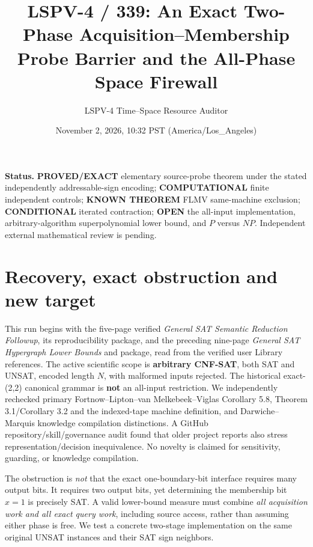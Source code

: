 \documentclass[11pt]{article}
\title{LSPV-4 / 339: An Exact Two-Phase Acquisition--Membership Probe Barrier and the All-Phase Space Firewall}
\author{LSPV-4 Time--Space Resource Auditor}
\date{November 2, 2026, 10:32 PST (America/Los\_Angeles)}
\begin{document}
\maketitle
\noindent\textbf{Status.} \textbf{PROVED/EXACT} elementary source-probe theorem under the stated independently addressable-sign encoding; \textbf{COMPUTATIONAL} finite independent controls; \textbf{KNOWN THEOREM} FLMV same-machine exclusion; \textbf{CONDITIONAL} iterated contraction; \textbf{OPEN} the all-input implementation, arbitrary-algorithm superpolynomial lower bound, and $P$ versus $NP$. Independent external mathematical review is pending.

\section{Recovery, exact obstruction and new target}
This run begins with the five-page verified \emph{General SAT Semantic Reduction Followup}, its reproducibility package, and the preceding nine-page \emph{General SAT Hypergraph Lower Bounds} and package, read from the verified user Library references. The active scientific scope is \textbf{arbitrary CNF-SAT}, both SAT and UNSAT, encoded length $N$, with malformed inputs rejected. The historical exact-(2,2) canonical grammar is \textbf{not} an all-input restriction. We independently rechecked primary Fortnow--Lipton--van Melkebeek--Viglas Corollary 5.8, Theorem 3.1/Corollary 3.2 and the indexed-tape machine definition, and Darwiche--Marquis knowledge compilation distinctions. A GitHub repository/skill/governance audit found that older project reports also stress representation/decision inequivalence. No novelty is claimed for sensitivity, guarding, or knowledge compilation.

\noindent The obstruction is \emph{not} that the exact one-boundary-bit interface requires many output bits. It requires two output bits, yet determining the membership bit $x=1$ is precisely SAT. A valid lower-bound measure must combine \emph{all acquisition work and all exact query work}, including source access, rather than assuming either phase is free. We test a concrete two-stage implementation on the same original UNSAT instances and their SAT sign neighbors.
\end{document}
